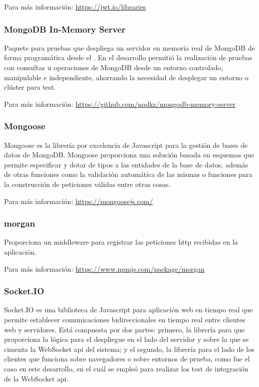Para más información: \href{https://jwt.io/libraries}{https://jwt.io/libraries}

\subsubsection{MongoDB In-Memory Server}
\label{lib:api:inmemory_server}

Paquete para pruebas que despliega un servidor en memoria real de MongoDB de forma programática desde el . En el desarrollo permitió la realización de pruebas con consultas u operaciones de MongoDB desde un entorno controlado, manipulable e independiente, ahorrando la necesidad de desplegar un entorno o clúster para test.

Para más información: \href{https://github.com/nodkz/mongodb-memory-server}{https://github.com/nodkz/mongodb-memory-server}

\subsubsection{Mongoose}
\label{lib:api:mongoose}

Mongoose es la librería por excelencia de Javascript para la gestión de bases de datos de MongoDB. Mongoose proporciona una solución basada en esquemas que permite especificar y dotar de tipos a las entidades de la base de datos, además de otras funciones como la validación automática de las mismas o funciones para la construcción de peticiones válidas entre otras cosas.

Para más información: \href{https://mongoosejs.com/}{https://mongoosejs.com/}

\subsubsection{morgan}
\label{lib:api:morgan}

Proporciona un \gls{middleware} para registrar las peticiones \acrshort{http} recibidas en la aplicación.

Para más información: \href{https://www.npmjs.com/package/morgan}{https://www.npmjs.com/package/morgan}

\subsubsection{Socket.IO}
\label{lib:api:socket_io}

Socket.IO es una biblioteca de Javascript para aplicación web en tiempo real que permite establecer comunicaciones bidireccionales en tiempo real entre clientes web y servidores. Está compuesta por dos partes: primero, la librería para  que proporciona la lógica para el despliegue en el lado del servidor y sobre la que se cimenta la WebSocket \acrshort{api} del sistema; y el segundo, la librería para el lado de los clientes que funciona sobre navegadores o sobre entornos de prueba, como fue el caso en este desarrollo, en el cuál se empleó para realizar los test de integración de la WebSocket \acrshort{api}.

